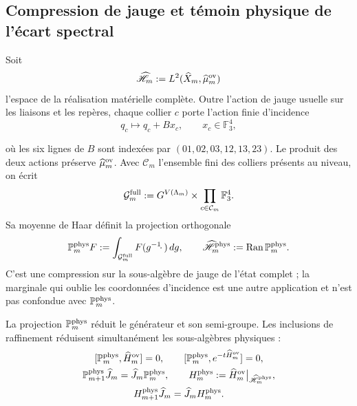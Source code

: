 \subsection*{Compression de jauge et témoin physique de l'écart spectral}

Soit
\[
 \widehat{\mathscr H}_m
 :=L^2(\widehat X_m,\widehat\mu_m^{\rm ov})
\]
l'espace de la réalisation matérielle complète. Outre l'action de jauge usuelle sur les liaisons et les repères, chaque collier \(c\) porte l'action finie d'incidence
\begin{equation}\label{eq:amp-ym-accion-gauge-incidencia}
 q_c\longmapsto q_c+Bx_c,
 \qquad x_c\in\mathbb F_3^4,
\end{equation}

où les six lignes de \(B\) sont indexées par
\((01,02,03,12,13,23)\). Le produit des deux actions préserve
\(\widehat\mu_m^{\rm ov}\). Avec \(\mathcal C_m\) l’ensemble fini des
colliers présents au niveau, on écrit
\[
 \mathcal G_m^{\rm full}
 :=G^{V(\Lambda_m)}
   \times\prod_{c\in\mathcal C_m}\mathbb F_3^4.
\]
Sa moyenne de Haar définit la projection
orthogonale
\begin{equation}\label{eq:amp-ym-proyeccion-fisica-haar}
 \mathbb P_m^{\rm phys}F
 :=\int_{\mathcal G_m^{\rm full}}F(g^{-1}\!\cdot\,)\,dg,
 \qquad
 \widehat{\mathscr H}_m^{\rm phys}
 :=\operatorname{Ran}\mathbb P_m^{\rm phys}.
\end{equation}
C'est une compression sur la sous-algèbre de jauge de l'état complet ; la marginale qui oublie les coordonnées d'incidence est une autre application et n'est pas confondue avec \(\mathbb P_m^{\rm phys}\).

\begin{lemma}
\label{lem:amp-ym-compresion-fisica}
La projection \(\mathbb P_m^{\rm phys}\) réduit le générateur et son
semi-groupe. Les inclusions de raffinement réduisent simultanément les
sous-algèbres physiques :
\begin{equation}\label{eq:amp-ym-compresion-entrelazada}
 \begin{gathered}
 \relax
 [\mathbb P_m^{\rm phys},\widehat H_m^{\rm ov}]=0,
 \qquad
 [\mathbb P_m^{\rm phys},e^{-t\widehat H_m^{\rm ov}}]=0,\\
 \mathbb P_{m+1}^{\rm phys}\widehat J_m
 =\widehat J_m\mathbb P_m^{\rm phys},\qquad
 H_m^{\rm phys}
 :=\widehat H_m^{\rm ov}\big|_{\widehat{\mathscr H}_m^{\rm phys}},\\
 H_{m+1}^{\rm phys}\widehat J_m
 =\widehat J_mH_m^{\rm phys}.
 \end{gathered}
\end{equation}
\end{lemma}

